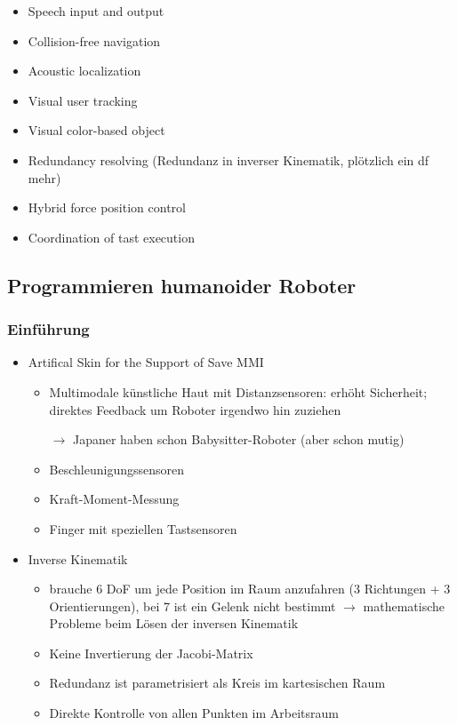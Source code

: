 \begin{itemize}
	\begin{itemize}
		\item Speech input and output
		\item Collision-free navigation
		\item Acoustic localization
		\item Visual user tracking
		\item Visual color-based object
		\item Redundancy resolving (Redundanz in inverser Kinematik, plötzlich ein df mehr)
		\item Hybrid force position control
		\item Coordination of tast execution
	\end{itemize}
\end{itemize}

\subsection{Programmieren humanoider Roboter}

\subsubsection{Einführung}
\begin{itemize}
	\item Artifical Skin for the Support of Save MMI
	\begin{itemize}
		 \item Multimodale künstliche Haut mit Distanzsensoren: erhöht Sicherheit; direktes Feedback um Roboter irgendwo hin zuziehen
		 \item[$\rightarrow$] Japaner haben schon Babysitter-Roboter (aber schon mutig)
		 \item Beschleunigungssensoren
		 \item Kraft-Moment-Messung
		 \item Finger mit speziellen Tastsensoren
	\end{itemize}
	\item Inverse Kinematik
	\begin{itemize}
		\item brauche 6 DoF um jede Position im Raum anzufahren (3 Richtungen + 3 Orientierungen), bei 7 ist ein Gelenk nicht bestimmt $\rightarrow$ mathematische Probleme beim Lösen der inversen Kinematik
		\item Keine Invertierung der Jacobi-Matrix
		\item Redundanz ist parametrisiert als Kreis im kartesischen Raum
		\item Direkte Kontrolle von allen Punkten im Arbeitsraum
	\end{itemize}
\end{itemize}

